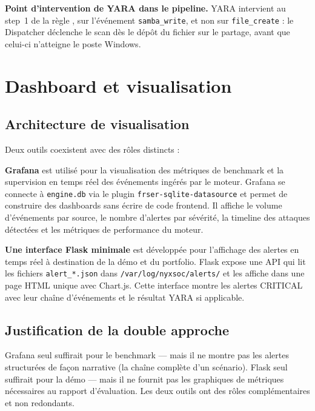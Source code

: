 \documentclass[12pt,a4paper]{article}
\begin{document}
\textbf{Point d'intervention de YARA dans le pipeline.}
YARA intervient au step~1 de la règle
\texttt{}, sur l'événement
\texttt{samba\_write}, et non sur \texttt{file\_create} : le
Dispatcher déclenche le scan dès le dépôt du fichier sur le partage,
avant que celui-ci n'atteigne le poste Windows.


\section{Dashboard et visualisation}

\subsection{Architecture de visualisation}

Deux outils coexistent avec des rôles distincts :

\textbf{Grafana} est utilisé pour la visualisation des métriques de
benchmark et la supervision en temps réel des événements ingérés par
le moteur. Grafana se connecte à \texttt{engine.db} via le plugin
\texttt{frser-sqlite-datasource} et permet de construire des dashboards
sans écrire de code frontend. Il affiche le volume d'événements par
source, le nombre d'alertes par sévérité, la timeline des attaques
détectées et les métriques de performance du moteur.

\textbf{Une interface Flask minimale} est développée pour l'affichage
des alertes en temps réel à destination de la démo et du portfolio.
Flask expose une API qui lit les fichiers \texttt{alert\_*.json} dans
\texttt{/var/log/nyxsoc/alerts/} et les affiche dans une page HTML
unique avec Chart.js. Cette interface montre les alertes CRITICAL avec
leur chaîne d'événements et le résultat YARA si applicable.

\subsection{Justification de la double approche}

Grafana seul suffirait pour le benchmark --- mais il ne montre pas les
alertes structurées de façon narrative (la chaîne complète d'un scénario).
Flask seul suffirait pour la démo --- mais il ne fournit pas les graphiques
de métriques nécessaires au rapport d'évaluation. Les deux outils ont des
rôles complémentaires et non redondants.
\end{document}
